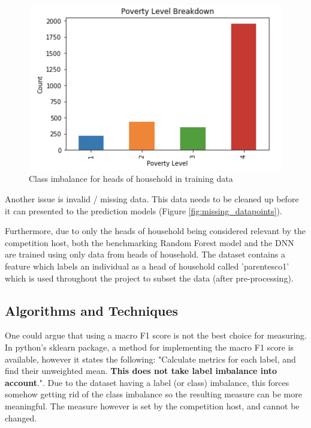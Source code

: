 \documentclass[preprint,12pt]{elsarticle}
\begin{document}
\begin{figure}[h!]
\centering\includegraphics[width=0.8\linewidth]{class_imbalance}
\caption{Class imbalance for heads of household in training data}
\label{fig:class_imbalance}
\end{figure}

Another issue is invalid / missing data. This data needs to be cleaned up before it can presented to the prediction models (Figure \ref{fig:missing_datapoints}).

Furthermore, due to only the heads of household being considered relevant by the competition host, both the benchmarking Random Forest model and the DNN are trained using only data from heads of household. The dataset contains a feature which labels an individual as a head of household called 'parentesco1' which is used throughout the project to subset the data (after pre-processing).



\subsection{Algorithms and Techniques}

One could argue that using a macro F1 score is not the best choice for measuring. In python's sklearn package, a method for implementing the macro F1 score is available, however it states the following: "Calculate metrics for each label, and find their unweighted mean. \textbf{This does not take label imbalance into account}.". Due to the dataset having a label (or class) imbalance, this forces somehow getting rid of the class imbalance so the resulting measure can be more meaningful. The measure however is set by the competition host, and cannot be changed. 
\end{document}
